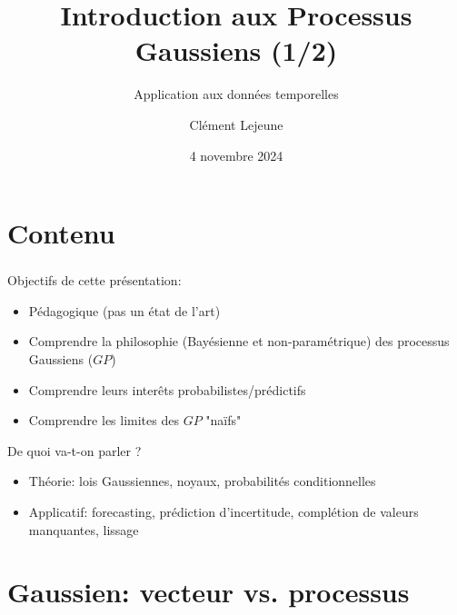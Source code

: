 \documentclass[xcolor=svgnames, t]{beamer}
\title[Introduction aux Processus Gaussiens]{Introduction aux Processus Gaussiens (1/2)}
\subtitle{Application aux données temporelles}
\institute[]{}
\author[Cl\'ement Lejeune]{Cl\'ement Lejeune}
\institute[TSN/AD/AD3/IA]{
Thales Services Numériques,
\\ AD/AD3/IA
}
\date{4 novembre 2024}
\begin{document}
\frame{\titlepage}

\section{Contenu}
\begin{frame}\frametitle{\secname}
  Objectifs de cette présentation:
  \begin{itemize}
    \item Pédagogique (pas un état de l'art)
    \pause
    \item Comprendre la philosophie (Bayésienne et non-paramétrique) des processus Gaussiens ($GP$)
    \pause
    \item Comprendre leurs interêts probabilistes/prédictifs
    \pause
    \item Comprendre les limites des $GP$ "naïfs"
  \end{itemize}
  De quoi va-t-on parler ?
  \begin{itemize}
    \item Théorie: lois Gaussiennes, noyaux, probabilités conditionnelles
    \pause
    \item Applicatif: forecasting, prédiction d'incertitude, complétion de valeurs manquantes, lissage
  \end{itemize}
\end{frame}

\AtBeginSubsection[]
{
  \begin{frame}\frametitle{\secname}
    \tableofcontents[currentsubsection]
  \end{frame}
}

\section{Gaussien: vecteur vs. processus}
\end{document}
